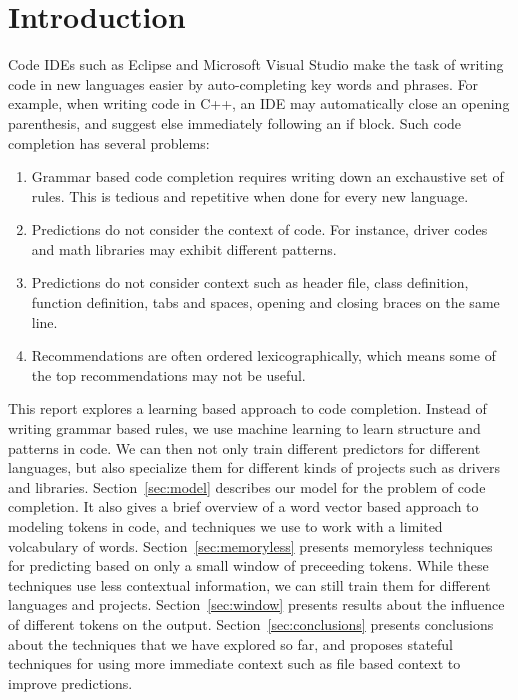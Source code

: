 \section{Introduction}
\label{sec:intro}

\noindent
Code IDEs such as Eclipse and Microsoft Visual Studio make the task of writing
code in new languages easier by auto-completing key words and phrases.
For example, when writing code in C++, an IDE may automatically close an
opening parenthesis, and suggest else immediately following an if block.
Such code completion has several problems:
\begin{enumerate}
  \item Grammar based code completion requires writing down an exchaustive set
    of rules. This is tedious and repetitive when done for every new language.
  \item Predictions do not consider the context of code. For instance, driver
    codes and math libraries may exhibit different patterns.
  \item Predictions do not consider context such as header file, class
    definition, function definition, tabs and spaces, opening and closing
    braces on the same line.
  \item Recommendations are often ordered lexicographically, which means some
    of the top recommendations may not be useful.
\end{enumerate}

This report explores a learning based approach to code completion. Instead of
writing grammar based rules, we use machine learning to learn structure and
patterns in code. We can then not only train different predictors for different
languages, but also specialize them for different kinds of projects such as
drivers and libraries.
Section~\ref{sec:model} describes our model for the problem of code completion.
It also gives a brief overview of a word vector based approach to modeling
tokens in code, and techniques we use to work with a limited volcabulary of
words.
Section~\ref{sec:memoryless} presents memoryless techniques for predicting
based on only a small window of preceeding tokens. While these techniques use
less contextual information, we can still train them for different languages
and projects.
Section~\ref{sec:window} presents results about the influence of different
tokens on the output.
Section~\ref{sec:conclusions} presents conclusions about the techniques that we
have explored so far, and proposes stateful techniques for using more immediate
context such as file based context to improve predictions.
